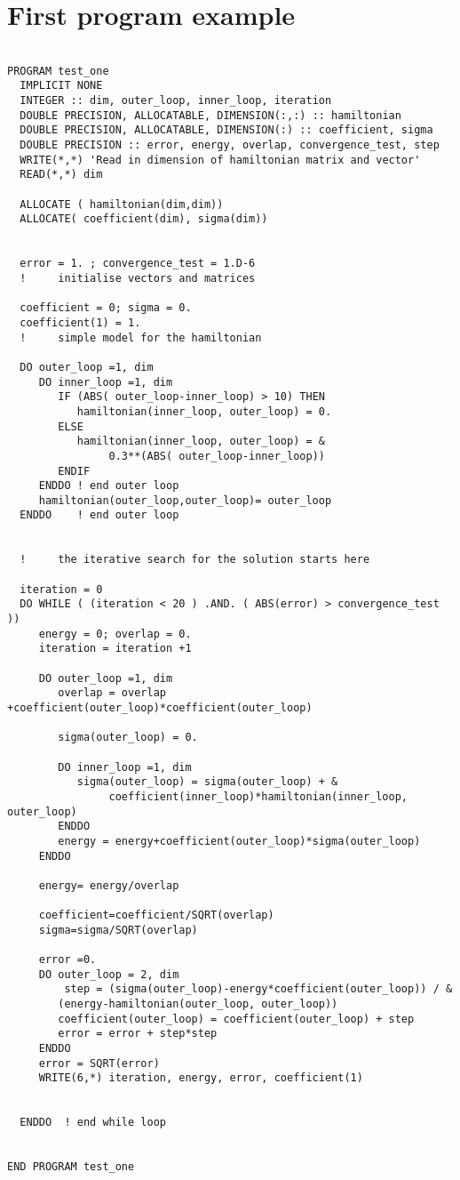\section{First program example}
\begin{verbatim}

PROGRAM test_one
  IMPLICIT NONE
  INTEGER :: dim, outer_loop, inner_loop, iteration
  DOUBLE PRECISION, ALLOCATABLE, DIMENSION(:,:) :: hamiltonian
  DOUBLE PRECISION, ALLOCATABLE, DIMENSION(:) :: coefficient, sigma
  DOUBLE PRECISION :: error, energy, overlap, convergence_test, step
  WRITE(*,*) 'Read in dimension of hamiltonian matrix and vector'
  READ(*,*) dim

  ALLOCATE ( hamiltonian(dim,dim))
  ALLOCATE( coefficient(dim), sigma(dim)) 


  error = 1. ; convergence_test = 1.D-6
  !     initialise vectors and matrices

  coefficient = 0; sigma = 0.
  coefficient(1) = 1.
  !     simple model for the hamiltonian

  DO outer_loop =1, dim
     DO inner_loop =1, dim
        IF (ABS( outer_loop-inner_loop) > 10) THEN
           hamiltonian(inner_loop, outer_loop) = 0.
        ELSE
           hamiltonian(inner_loop, outer_loop) = &
                0.3**(ABS( outer_loop-inner_loop))
        ENDIF
     ENDDO ! end outer loop
     hamiltonian(outer_loop,outer_loop)= outer_loop
  ENDDO    ! end outer loop


  !     the iterative search for the solution starts here

  iteration = 0
  DO WHILE ( (iteration < 20 ) .AND. ( ABS(error) > convergence_test )) 
     energy = 0; overlap = 0.
     iteration = iteration +1 

     DO outer_loop =1, dim
        overlap = overlap +coefficient(outer_loop)*coefficient(outer_loop)

        sigma(outer_loop) = 0.

        DO inner_loop =1, dim
           sigma(outer_loop) = sigma(outer_loop) + &
                coefficient(inner_loop)*hamiltonian(inner_loop, outer_loop)
        ENDDO
        energy = energy+coefficient(outer_loop)*sigma(outer_loop)
     ENDDO

     energy= energy/overlap

     coefficient=coefficient/SQRT(overlap)
     sigma=sigma/SQRT(overlap)

     error =0.
     DO outer_loop = 2, dim
         step = (sigma(outer_loop)-energy*coefficient(outer_loop)) / &
        (energy-hamiltonian(outer_loop, outer_loop))
        coefficient(outer_loop) = coefficient(outer_loop) + step
        error = error + step*step
     ENDDO
     error = SQRT(error)
     WRITE(6,*) iteration, energy, error, coefficient(1)


  ENDDO  ! end while loop


END PROGRAM test_one
\end{verbatim}

